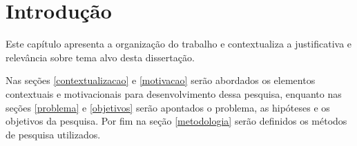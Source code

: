 \chapter{Introdução}
\label{chap:intro}

Este capítulo apresenta a organização do trabalho e contextualiza a justificativa e relevância sobre tema alvo desta dissertação. 

 

Nas seções \ref{contextualizacao} e \ref{motivacao} serão abordados os elementos contextuais e motivacionais para desenvolvimento dessa pesquisa, enquanto nas seções \ref{problema} e \ref{objetivos} serão apontados o problema, as hipóteses e os objetivos da pesquisa. Por fim na seção \ref{metodologia} serão definidos os métodos de pesquisa utilizados.


 

 
  
  
 
 
      
 
 
% 
 
% 

%

%

%  
